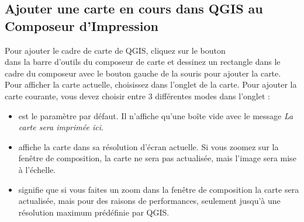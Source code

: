 \subsection{Ajouter une carte en cours dans QGIS au Composeur d'Impression}

Pour ajouter le cadre de carte de QGIS, cliquez sur le bouton\\  dans la barre d'outils du composeur de carte et dessinez un rectangle dans le cadre du composeur avec le bouton gauche de la souris pour ajouter la carte. Pour afficher la carte actuelle, choisissez  dans l'onglet  de la carte.
Pour ajouter la carte courante, vous devez choisir entre 3 différentes modes dans l'onglet  :


\begin{itemize}[label=--]
\item {} est le paramètre par défaut. Il n'affiche qu'une boîte vide avec le message \textit{La carte sera imprimée ici}. 
\item {} affiche la carte dans sa résolution d'écran actuelle. Si vous zoomez sur la fenêtre de composition, la carte ne sera pas actualisée, mais l'image sera mise à l'échelle.
\item {} signifie que si vous faites un zoom dans la fenêtre de composition la carte sera actualisée, mais pour des raisons de performances, seulement jusqu'à une résolution maximum prédéfinie par QGIS.
\end{itemize}


